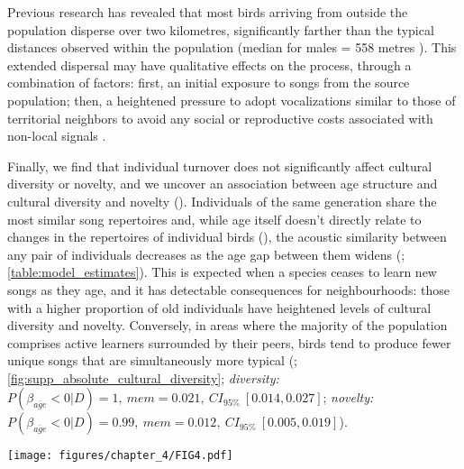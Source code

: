Previous research \parencite{verhulst1997} has revealed that most birds arriving from outside the population disperse over two kilometres, significantly farther than the typical distances observed within the population (median for males = 558 metres \parencite{greenwood1979}). This extended dispersal may have qualitative effects on the process, through a combination of factors: first, an initial exposure to songs from the source population; then, a heightened pressure to adopt vocalizations similar to those of territorial neighbors to avoid any social or reproductive costs associated with non-local signals \parencite{payne1983, baker1981, mortega2014, lachlan2014, beecher2008}.

Finally, we find that individual turnover does not significantly affect cultural diversity or novelty, and we uncover an association between age structure and cultural diversity and novelty (). Individuals of the same generation share the most similar song repertoires and, while age itself doesn't directly relate to changes in the repertoires of individual birds (), the acoustic similarity between any pair of individuals decreases as the age gap between them widens (; \autoref{table:model_estimates}). This is expected when a species ceases to learn new songs as they age, and it has detectable consequences for neighbourhoods: those with a higher proportion of old individuals have heightened levels of cultural diversity and novelty. Conversely, in areas where the majority of the population comprises active learners surrounded by their peers, birds tend to produce fewer unique songs that are simultaneously more typical (; \autoref{fig:supp_absolute_cultural_diversity}; \textit{diversity:} $P(\beta_{\overline{age}} < 0 | D) = 1,~mem=0.021,~CI_{95\%}~[0.014, 0.027]$; \textit{novelty:} $P(\beta_{\overline{age}} < 0 | D) = 0.99,~mem=0.012,~CI_{95\%}~[0.005, 0.019]$).

\begin{figure*}[th]
    \centering
    \texttt{[image: figures/chapter\_4/FIG4.pdf]}
    \label{c4_fig:turnover}
\end{figure*}

